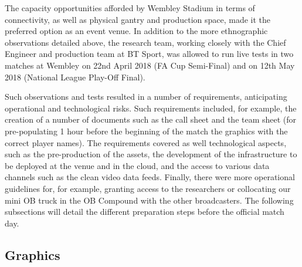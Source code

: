 \documentclass[sigchi-a, authorversion]{acmart}
\begin{document}
The capacity opportunities afforded by Wembley Stadium in terms of connectivity,
as well as physical gantry and production space, made it the preferred option as
an event venue. In addition to the more ethnographic observations detailed above,
the research team, working closely with the Chief Engineer and production team
at BT Sport, was allowed to run live tests in two matches at Wembley on 22nd
April 2018 (FA Cup Semi-Final) and on 12th May 2018 (National League Play-Off Final).

Such observations and tests resulted in a number of requirements, anticipating
operational and technological risks. Such requirements included, for example,
the creation of a number of documents such as the call sheet and the team sheet
(for pre-populating 1 hour before the beginning of the match the graphics with
the correct player names). The requirements covered as well technological
aspects, such as the pre-production of the assets, the development of the
infrastructure to be deployed at the venue and in the cloud, and the access to
various data channels such as the clean video data feeds. Finally, there were
more operational guidelines for, for example, granting access to the researchers
or collocating our mini OB truck in the OB Compound with the other broadcasters.
The following subsections will detail the different preparation steps before the
official match day.


\subsection{Graphics}
\end{document}
